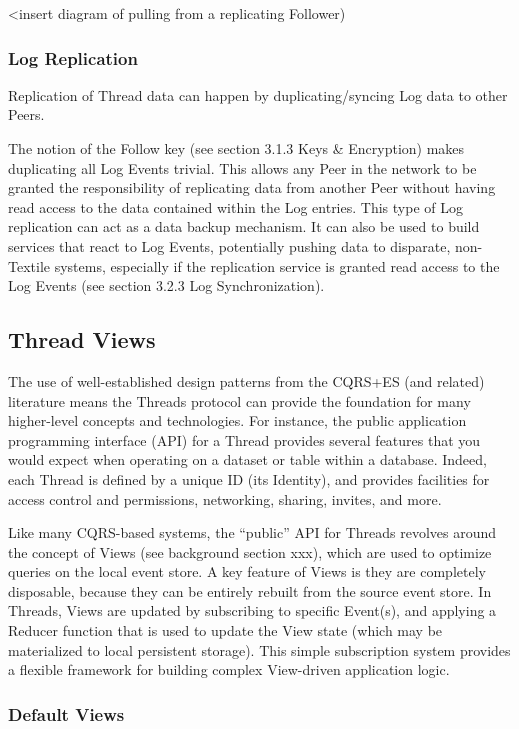 \documentclass{comjnl}
\begin{document}
<insert diagram of pulling from a replicating Follower)

\subsubsection{Log Replication}

Replication of Thread data can happen by duplicating/syncing Log data to other Peers.

The notion of the Follow key (see section 3.1.3 Keys \& Encryption) makes duplicating all Log Events trivial. This allows any Peer in the network to be granted the responsibility of replicating data from another Peer without having read access to the data contained within the Log entries. This type of Log replication can act as a data backup mechanism. It can also be used to build services that react to Log Events, potentially pushing data to disparate, non-Textile systems, especially if the replication service is granted read access to the Log Events (see section 3.2.3 Log Synchronization).

\subsection{Thread Views} \label{sec:threadviews}

The use of well-established design patterns from the CQRS+ES (and related) literature means the Threads protocol can provide the foundation for many higher-level concepts and technologies. For instance, the public application programming interface (API) for a Thread provides several features that you would expect when operating on a dataset or table within a database. Indeed, each Thread is defined by a unique ID (its Identity), and provides facilities for access control and permissions, networking, sharing, invites, and more.

Like many CQRS-based systems, the “public” API for Threads revolves around the concept of Views (see background section xxx), which are used to optimize queries on the local event store. A key feature of Views is they are completely disposable, because they can be entirely rebuilt from the source event store. In Threads, Views are updated by subscribing to specific Event(s), and applying a Reducer function that is used to update the View state (which may be materialized to local persistent storage). This simple subscription system provides a flexible framework for building complex View-driven application logic.

\subsubsection{Default Views}
\end{document}
